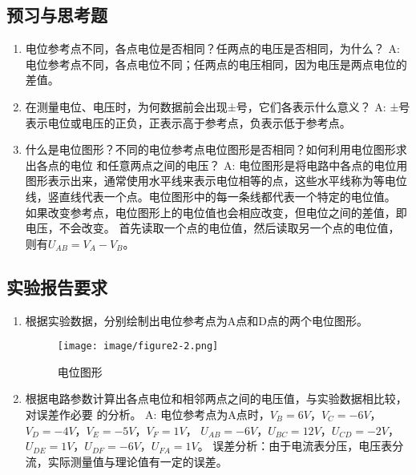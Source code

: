 \documentclass[UTF8]{article}
\begin{document}
        \subsection{预习与思考题}
            \begin{enumerate}[label=\textbf{\arabic*}.]
                \item 电位参考点不同，各点电位是否相同？任两点的电压是否相同，为什么？\newline
                A: 电位参考点不同，各点电位不同；任两点的电压相同，因为电压是两点电位的差值。
                \item 在测量电位、电压时，为何数据前会出现±号，它们各表示什么意义？\newline
                A: ±号表示电位或电压的正负，正表示高于参考点，负表示低于参考点。
                \item 什么是电位图形？不同的电位参考点电位图形是否相同？如何利用电位图形求出各点的电位
                和任意两点之间的电压？\newline
                A: 电位图形是将电路中各点的电位用图形表示出来，通常使用水平线来表示电位相等的点，这些水平线称为等电位线，竖直线代表一个点。电位图形中的每一条线都代表一个特定的电位值。
                如果改变参考点，电位图形上的电位值也会相应改变，但电位之间的差值，即电压，不会改变。
                首先读取一个点的电位值，然后读取另一个点的电位值，则有$U_{AB}=V_A - V_B$。
            \end{enumerate}
        \subsection{实验报告要求}
            \begin{enumerate}[label=\textbf{\arabic*}.]
                \item 根据实验数据，分别绘制出电位参考点为A点和D点的两个电位图形。
                \begin{figure}[H]
                    \centering
                    \texttt{[image: image/figure2-2.png]}
                    \caption{电位图形}
                \end{figure}
                \item 根据电路参数计算出各点电位和相邻两点之间的电压值，与实验数据相比较，对误差作必要
                的分析。\newline
                A: 电位参考点为A点时，$V_B = 6V$，$V_C = -6V$，$V_D = -4V$，$V_E = -5V$，$V_F = 1V$，
                $U_{AB} = -6V$，$U_{BC} = 12V$，$U_{CD} = -2V$，$U_{DE} = 1V$，$U_{DF} = -6V$，$U_{FA} = 1V$。
                误差分析：由于电流表分压，电压表分流，实际测量值与理论值有一定的误差。
            \end{enumerate}
\end{document}
